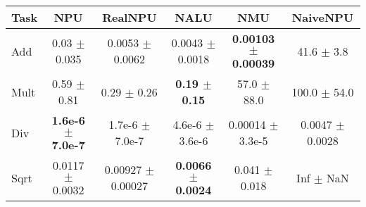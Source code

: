 \begin{tabular}{lccccc}
\toprule
Task & NPU & RealNPU & NALU & NMU & NaiveNPU\\
\midrule
Add  & 0.03 $\pm$ 0.035 & 0.0053 $\pm$ 0.0062 &0.0043 $\pm$ 0.0018 & \textbf{0.00103 $\pm$ 0.00039} & 41.6 $\pm$ 3.8 \\
Mult & 0.59 $\pm$ 0.81 & 0.29 $\pm$ 0.26 &\textbf{0.19 $\pm$ 0.15} & 57.0 $\pm$ 88.0 & 100.0 $\pm$ 54.0 \\
Div  & \textbf{1.6e-6 $\pm$ 7.0e-7} & 1.7e-6 $\pm$ 7.0e-7 &4.6e-6 $\pm$ 3.6e-6 & 0.00014 $\pm$ 3.3e-5 & 0.0047 $\pm$ 0.0028 \\
Sqrt & 0.0117 $\pm$ 0.0032 & 0.00927 $\pm$ 0.00027 &\textbf{0.0066 $\pm$ 0.0024} & 0.041 $\pm$ 0.018 & Inf $\pm$ NaN \\
\bottomrule
\end{tabular}
